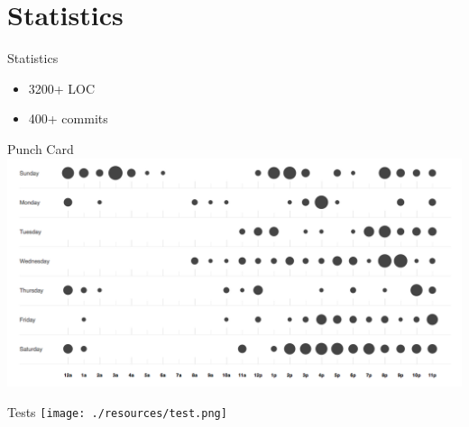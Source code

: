 \section{Statistics}

\begin{frame}{Statistics}
\begin{itemize}
	\item 3200+ LOC
	\item 400+ commits
\end{itemize}
\end{frame}

\begin{frame}{Punch Card}
	\includegraphics[width=\textwidth]{./resources/punchcard.png}
\end{frame}

\begin{frame}{Tests}
	\texttt{[image: ./resources/test.png]}
\end{frame}
